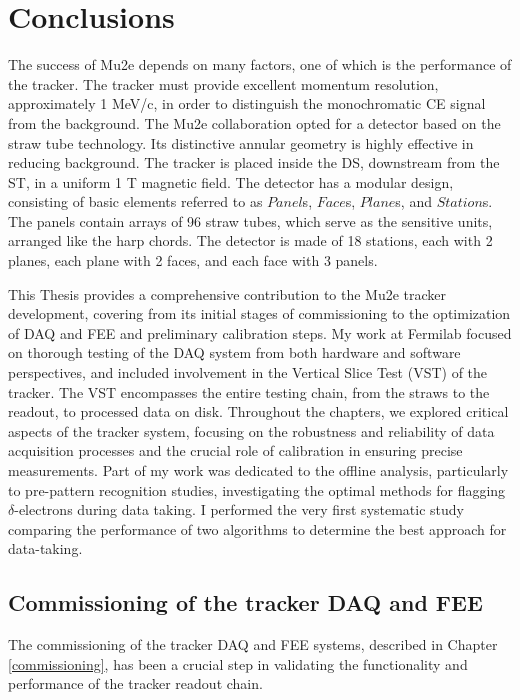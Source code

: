 \chapter{Conclusions}\label{conclusions}
The success of Mu2e depends on many factors, 
one of which is the performance of the tracker. 
The tracker must provide excellent momentum 
resolution, approximately 1 MeV/c, 
in order to distinguish the monochromatic CE 
signal from the background. 
The Mu2e collaboration opted for a detector 
based on the straw tube technology.  
Its distinctive annular geometry is highly 
effective in reducing background. 
The tracker is placed inside the 
DS, downstream from the ST, 
in a uniform 1 T magnetic field. The detector 
has a modular design, consisting of basic 
elements referred to as 
$Panel$s, $Face$s, $Plane$s, and $Station$s. 
The panels contain arrays of 96 straw tubes, 
which serve as the sensitive units, arranged 
like the harp chords. The detector is made of 
18 stations, each with 2 planes, each plane 
with 2 faces, and each face with 3 panels. 

This Thesis provides a comprehensive 
contribution to the Mu2e tracker 
development, covering from its initial stages of 
commissioning to the optimization 
of DAQ and FEE and preliminary calibration 
steps. My work at Fermilab 
focused on thorough testing of the DAQ system 
from both hardware and 
software perspectives, and included 
involvement in the Vertical Slice Test 
(VST) of the tracker. 
The VST encompasses the entire testing 
chain, from the straws to the readout, 
to processed data on disk.
Throughout the chapters, we explored 
critical aspects of the tracker 
system, focusing on the robustness and 
reliability of data acquisition 
processes and the crucial role of 
calibration in ensuring precise measurements. 
Part of my work was dedicated to the offline 
analysis, particularly to pre-pattern recognition 
studies, investigating the optimal methods for 
flagging $\delta$-electrons during data taking. 
I performed the very first systematic study 
comparing the performance of two algorithms 
to determine the best approach for data-taking. 
\section{Commissioning of the tracker DAQ and FEE}
The commissioning of the tracker DAQ and FEE 
systems, described in Chapter 
\ref{commissioning}, has been a crucial step 
in validating the functionality 
and performance of the tracker readout chain.

